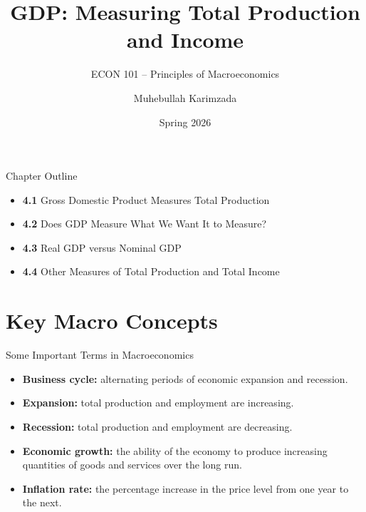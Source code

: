 \documentclass[aspectratio=169]{beamer}
\title{\textbf{GDP: Measuring Total Production and Income}}
\subtitle{{\large ECON 101 -- Principles of Macroeconomics}}
\author{Muhebullah Karimzada}
\date{Spring 2026}
\begin{document}

\begin{frame}[plain]
  \titlepage
\end{frame}

\begin{frame}{Chapter Outline}
\transfade
\begin{itemize}[<+->]
  \item \textbf{4.1} Gross Domestic Product Measures Total Production
  \item \textbf{4.2} Does GDP Measure What We Want It to Measure?
  \item \textbf{4.3} Real GDP versus Nominal GDP
  \item \textbf{4.4} Other Measures of Total Production and Total Income
\end{itemize}
\end{frame}

\section*{Key Macro Concepts}

\begin{frame}{Some Important Terms in Macroeconomics}
\transfade
\begin{itemize}[<+->]
  \item \textbf{Business cycle:} alternating periods of economic \alert{expansion} and \alert{recession}.
  \item \textbf{Expansion:} total production and employment are \alert{increasing}.
  \item \textbf{Recession:} total production and employment are \alert{decreasing}.
  \item \textbf{Economic growth:} the ability of the economy to produce increasing quantities of goods and services over the long run.
  \item \textbf{Inflation rate:} the \alert{percentage increase} in the price level from one year to the next.
\end{itemize}
\end{frame}
\end{document}
